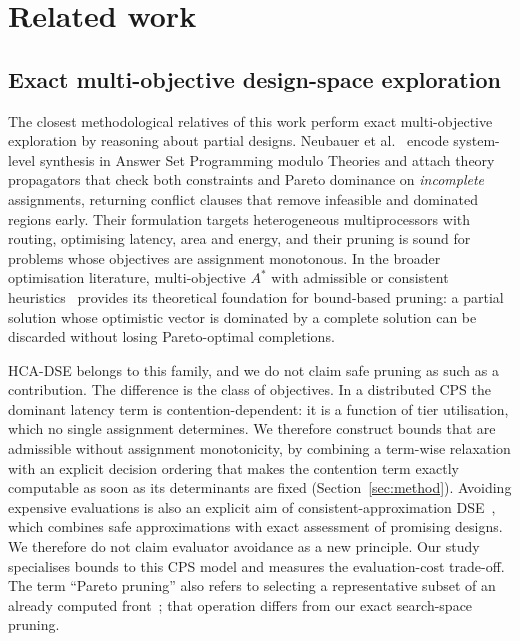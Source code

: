 \documentclass[preprint,11pt,3p]{elsarticle}
\theoremstyle{plain}
\theoremstyle{definition}
\begin{document}
\section{Related work}
\label{sec:related}

\subsection{Exact multi-objective design-space exploration}
The closest methodological relatives of this work perform exact multi-objective
exploration by reasoning about partial designs. Neubauer et
al.~\cite{neubauer2018exact} encode system-level synthesis in Answer Set Programming
modulo Theories and attach theory propagators that check both constraints and Pareto
dominance on \emph{incomplete} assignments, returning conflict clauses that remove
infeasible and dominated regions early. Their formulation targets heterogeneous
multiprocessors with routing, optimising latency, area and energy, and their pruning is
sound for problems whose objectives are assignment monotonous. In the broader
optimisation literature, multi-objective $A^{*}$ with admissible or
consistent heuristics~\cite{stewart1991moa,mandow2010namoa} provides its theoretical
foundation for bound-based pruning: a partial solution whose optimistic vector is dominated by a complete
solution can be discarded without losing Pareto-optimal completions.

HCA-DSE belongs to this family, and we do not claim safe pruning as such as a
contribution. The difference is the class of objectives. In a distributed CPS the
dominant latency term is contention-dependent: it is a function of tier utilisation,
which no single assignment determines. We therefore construct bounds that are admissible
without assignment monotonicity, by combining a term-wise relaxation with an explicit
decision ordering that makes the contention term exactly computable as soon as its
determinants are fixed (Section~\ref{sec:method}). Avoiding expensive evaluations is also an explicit aim of consistent-approximation
DSE~\cite{neubauer2020consistent}, which combines safe approximations with exact
assessment of promising designs. We therefore do not claim evaluator avoidance
as a new principle. Our study specialises bounds to this CPS model and measures
the evaluation-cost trade-off. The term ``Pareto pruning'' also refers to selecting
a representative subset of an already computed front~\cite{paretopruning2022};
that operation differs from our exact search-space pruning.
\end{document}

